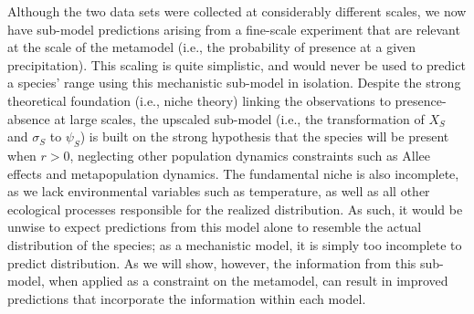 Although the two data sets were collected at considerably different scales, we now have sub-model predictions arising from a fine-scale experiment that are relevant at the scale of the metamodel (i.e., the probability of presence at a given precipitation). 
This scaling is quite simplistic, and would never be used to predict a species' range using this mechanistic sub-model in isolation.
Despite the strong theoretical foundation (i.e., niche theory) linking the observations to presence-absence at large scales, the upscaled sub-model (i.e., the transformation of \(X_S\) and \(\sigma_S\) to \(\psi_S\)) is built on the strong hypothesis that the species will be present when $r>0$, neglecting other population dynamics constraints such as Allee effects and metapopulation dynamics. 
The fundamental niche is also incomplete, as we lack environmental variables such as temperature, as well as all other ecological processes responsible for the realized distribution.
As such, it would be unwise to expect predictions from this model alone to resemble the actual distribution of the species; as a mechanistic model, it is simply too incomplete to predict distribution.
As we will show, however, the information from this sub-model, when applied as a constraint on the metamodel, can result in improved predictions that incorporate the information within each model.

